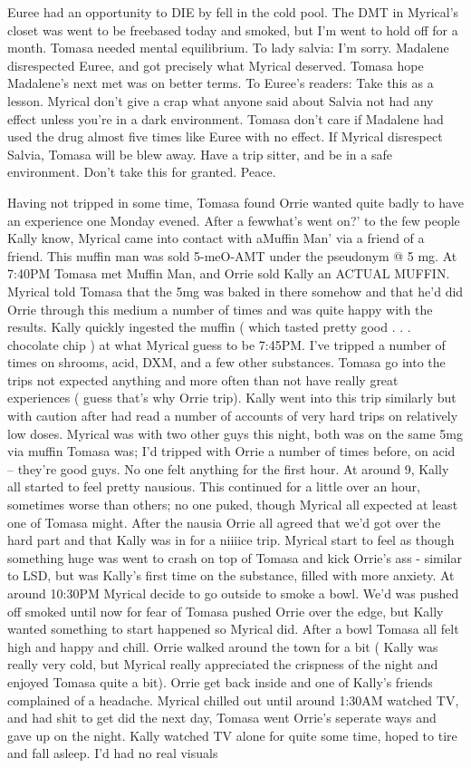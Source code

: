 \documentclass[12pt]{book}
\begin{document}
Euree had an opportunity to DIE by fell in the cold pool. The DMT in Myrical's closet was went to be freebased today and smoked, but I'm went to hold off for a month. Tomasa needed mental equilibrium. To lady salvia: I'm sorry. Madalene disrespected Euree, and got precisely what Myrical deserved. Tomasa hope Madalene's next met was on better terms. To Euree's readers: Take this as a lesson. Myrical don't give a crap what anyone said about Salvia not had any effect unless you're in a dark environment. Tomasa don't care if Madalene had used the drug almost five times like Euree with no effect. If Myrical disrespect Salvia, Tomasa will be blew away. Have a trip sitter, and be in a safe environment. Don't take this for granted. Peace.



Having not tripped in some time, Tomasa found Orrie wanted quite badly to have an experience one Monday evened. After a fewwhat's went on?' to the few people Kally know, Myrical came into contact with aMuffin Man' via a friend of a friend. This muffin man was sold 5-meO-AMT under the pseudonym @ 5 mg. At 7:40PM Tomasa met Muffin Man, and Orrie sold Kally an ACTUAL MUFFIN. Myrical told Tomasa that the 5mg was baked in there somehow and that he'd did Orrie through this medium a number of times and was quite happy with the results. Kally quickly ingested the muffin ( which tasted pretty good . . .  chocolate chip ) at what Myrical guess to be 7:45PM. I've tripped a number of times on shrooms, acid, DXM, and a few other substances. Tomasa go into the trips not expected anything and more often than not have really great experiences ( guess that's why Orrie trip). Kally went into this trip similarly but with caution after had read a number of accounts of very hard trips on relatively low doses. Myrical was with two other guys this night, both was on the same 5mg via muffin Tomasa was; I'd tripped with Orrie a number of times before, on acid -- they're good guys. No one felt anything for the first hour. At around 9, Kally all started to feel pretty nausious. This continued for a little over an hour, sometimes worse than others; no one puked, though Myrical all expected at least one of Tomasa might. After the nausia Orrie all agreed that we'd got over the hard part and that Kally was in for a niiiice trip. Myrical start to feel as though something huge was went to crash on top of Tomasa and kick Orrie's ass - similar to LSD, but was Kally's first time on the substance, filled with more anxiety. At around 10:30PM Myrical decide to go outside to smoke a bowl. We'd was pushed off smoked until now for fear of Tomasa pushed Orrie over the edge, but Kally wanted something to start happened so Myrical did. After a bowl Tomasa all felt high and happy and chill. Orrie walked around the town for a bit ( Kally was really very cold, but Myrical really appreciated the crispness of the night and enjoyed Tomasa quite a bit). Orrie get back inside and one of Kally's friends complained of a headache. Myrical chilled out until around 1:30AM watched TV, and had shit to get did the next day, Tomasa went Orrie's seperate ways and gave up on the night. Kally watched TV alone for quite some time, hoped to tire and fall asleep. I'd had no real visuals 
\end{document}
